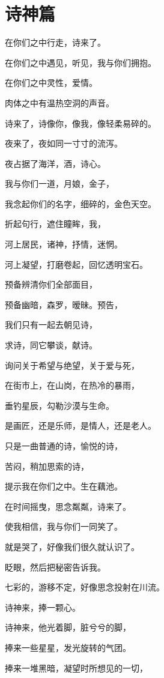 \documentclass[UTF8]{article}
\begin{document}
\section{诗神篇}
\par 在你们之中行走，诗来了。
\par 在你们之中遇见，听见，我与你们拥抱。
\par 在你们之中灵性，爱情。
\par 肉体之中有温热空洞的声音。
\\[0.6cm]
\par 诗来了，诗像你，像我，像轻柔易碎的。
\par 夜来了，夜如同一寸寸的流泻。
\par 夜占据了海洋，酒，诗心。
\par 我与你们一道，月娘，金子，
\par 我念起你们的名字，细碎的，金色天空。
\par 折起句行，遮住瞳眸，我，
\par 河上居民，诸神，抒情，迷惘。
\par 河上凝望，打磨卷起，回忆透明宝石。
\par 预备辨清你们全部面目，
\par 预备幽暗，森罗，暧昧。预告，
\par 我们只有一起去朝见诗，
\par 求诗，同它攀谈，献诗。
\par 询问关于希望与绝望，关于爱与死，
\par 在街市上，在山岗，在热冷的暴雨，
\par 垂钓星辰，勾勒沙漠与生命。
\par 是画匠，还是乐师，是情人，还是老人。
\par 只是一曲普通的诗，愉悦的诗，
\par 苦闷，稍加思索的诗，
\par 提示我在你们之中。生在藕池。
\par 在时间摇曳，思念粼粼，诗来了。
\par 使我相信，我与你们一同笑了。
\par 就是哭了，好像我们很久就认识了。
\\[0.6cm]
\par 眨眼，然后把秘密告诉我。
\par 七彩的，游移不定，好像思念投射在川流。
\par 诗神来，捧一颗心。
\par 诗神来，他光着脚，脏兮兮的脚，
\par 捧来一些星星，发光旋转的气团。
\par 捧来一堆黑暗，凝望时所想见的一切，
\end{document}
